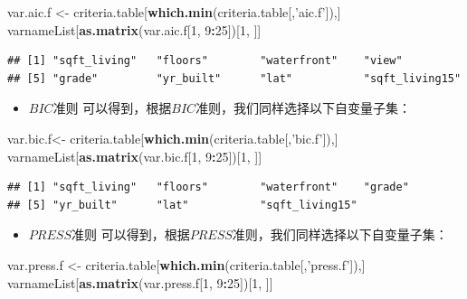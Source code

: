 \documentclass[]{article}
\newenvironment{Shaded}{\begin{snugshade}}{\end{snugshade}}
\newcommand{\KeywordTok}[1]{\textcolor[rgb]{0.13,0.29,0.53}{\textbf{#1}}}
\newcommand{\DecValTok}[1]{\textcolor[rgb]{0.00,0.00,0.81}{#1}}
\newcommand{\StringTok}[1]{\textcolor[rgb]{0.31,0.60,0.02}{#1}}
\newcommand{\OperatorTok}[1]{\textcolor[rgb]{0.81,0.36,0.00}{\textbf{#1}}}
\newcommand{\NormalTok}[1]{#1}
\providecommand{\tightlist}{%
  \setlength{\itemsep}{0pt}\setlength{\parskip}{0pt}}
\begin{document}
\begin{Shaded}
\begin{Highlighting}[]
\NormalTok{var.aic.f <-}\StringTok{ }\NormalTok{criteria.table[}\KeywordTok{which.min}\NormalTok{(criteria.table[,}\StringTok{'aic.f'}\NormalTok{]),]}
\NormalTok{varnameList[}\KeywordTok{as.matrix}\NormalTok{(var.aic.f[}\DecValTok{1}\NormalTok{, }\DecValTok{9}\OperatorTok{:}\DecValTok{25}\NormalTok{])[}\DecValTok{1}\NormalTok{, ]]}
\end{Highlighting}
\end{Shaded}

\begin{verbatim}
## [1] "sqft_living"   "floors"        "waterfront"    "view"         
## [5] "grade"         "yr_built"      "lat"           "sqft_living15"
\end{verbatim}

\begin{itemize}
\tightlist
\item
  \(BIC\)准则 可以得到，根据\(BIC\)准则，我们同样选择以下自变量子集：
\end{itemize}

\begin{Shaded}
\begin{Highlighting}[]
\NormalTok{var.bic.f<-}\StringTok{ }\NormalTok{criteria.table[}\KeywordTok{which.min}\NormalTok{(criteria.table[,}\StringTok{'bic.f'}\NormalTok{]),]}
\NormalTok{varnameList[}\KeywordTok{as.matrix}\NormalTok{(var.bic.f[}\DecValTok{1}\NormalTok{, }\DecValTok{9}\OperatorTok{:}\DecValTok{25}\NormalTok{])[}\DecValTok{1}\NormalTok{, ]]}
\end{Highlighting}
\end{Shaded}

\begin{verbatim}
## [1] "sqft_living"   "floors"        "waterfront"    "grade"        
## [5] "yr_built"      "lat"           "sqft_living15"
\end{verbatim}

\begin{itemize}
\tightlist
\item
  \(PRESS\)准则
  可以得到，根据\(PRESS\)准则，我们同样选择以下自变量子集：
\end{itemize}

\begin{Shaded}
\begin{Highlighting}[]
\NormalTok{var.press.f <-}\StringTok{ }\NormalTok{criteria.table[}\KeywordTok{which.min}\NormalTok{(criteria.table[,}\StringTok{'press.f'}\NormalTok{]),]}
\NormalTok{varnameList[}\KeywordTok{as.matrix}\NormalTok{(var.press.f[}\DecValTok{1}\NormalTok{, }\DecValTok{9}\OperatorTok{:}\DecValTok{25}\NormalTok{])[}\DecValTok{1}\NormalTok{, ]]}
\end{Highlighting}
\end{Shaded}
\end{document}
